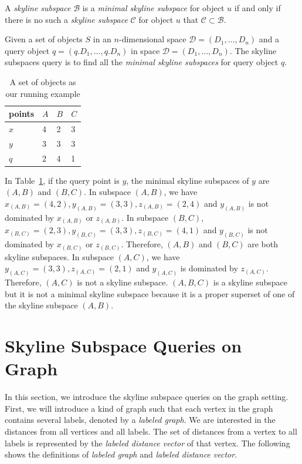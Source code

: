\begin{definition}
A \emph{skyline subspace} $\mathcal{B}$ is a \emph{minimal skyline subspace} for object $u$ if and only if there is no such a \emph{skyline subspace} $\mathcal{C}$ for object $u$ that $\mathcal{C} \subset \mathcal{B}$.
\end{definition}

\begin{definition}
Given a set of objects $S$ in an $n$-dimensional space $\mathcal{D} = (D_1,\dots,D_n)$ and a query object $q = (q.D_1,\dots,q.D_n)$ in space $\mathcal{D} = (D_1,\dots,D_n)$. The skyline subspaces query is to find all the \emph{minimal skyline subspaces} for query object $q$.
\end{definition}

\begin{table}[h]
    \centering
    \begin{tabular}{|l|l|l|l|}
    \hline
    points & $A$ & $B$ & $C$ \\ \hline
    $x$      & 4 & 2 & 3 \\ \hline
    $y$      & 3 & 3 & 3 \\ \hline
    $q$      & 2 & 4 & 1 \\ \hline
    \end{tabular}
    \caption{\label{tab:objects_example} A set of objects as our running example}
\end{table}

In Table~\ref{tab:objects_example}, if the query point is $y$, the minimal skyline subspaces of $y$ are $(A, B)$ and $(B, C)$.
In subspace $(A, B)$, we have $x_{(A, B)} = (4, 2), y_{(A, B)} = (3, 3), z_{(A, B)} = (2, 4)$ and $y_{(A, B)}$ is not dominated by $x_{(A, B)}$ or $z_{(A, B)}$. 
In subspace $(B, C)$, $x_{(B, C)} = (2, 3), y_{(B, C)} = (3, 3), z_{(B, C)} = (4, 1)$ and $y_{(B, C)}$ is not dominated by $x_{(B, C)}$ or $z_{(B, C)}$. Therefore, $(A, B)$ and $(B, C)$ are both skyline subspaces. 
In subspace $(A, C)$, we have $y_{(A, C)} = (3, 3), z_{(A, C)} = (2, 1)$ and $y_{(A, C)}$ is dominated by $z_{(A, C)}$. Therefore, $(A, C)$ is not a skyline subspace. 
$(A, B, C)$ is a skyline subspace but it is not a minimal skyline subspace because it is a proper superset of one of the skyline subspace $(A, B)$.

\section{Skyline Subspace Queries on Graph}
In this section, we introduce the skyline subspace queries on the graph setting. First, we will introduce a kind of graph such that each vertex in the graph contains several labels, denoted by a \emph{labeled graph}. We are interested in the distances from all vertices and all labels. The set of distances from a vertex to all labels is represented by the \emph{labeled distance vector} of that vertex. The following shows the definitions of \emph{labeled graph} and \emph{labeled distance vector}.

